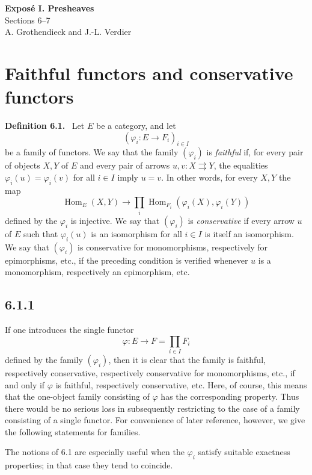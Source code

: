 \documentclass[11pt]{article}
\newcommand{\Hom}{\operatorname{Hom}}
\newenvironment{statement}[1]{\par\medskip\noindent\textbf{#1.}\ }{\par\medskip}
\begin{document}
\begin{center}
{\Large \textbf{Expos\'e I. Presheaves}}\\[0.35em]
{\large Sections 6--7}\\[0.35em]
A. Grothendieck and J.-L. Verdier
\end{center}

\bigskip


\setcounter{section}{5}
\section{Faithful functors and conservative functors}

\begin{statement}{Definition 6.1}
Let $E$ be a category, and let
\[
(\varphi_i:E\to F_i)_{i\in I}
\]
be a family of functors. We say that the family $(\varphi_i)$ is \emph{faithful} if, for every pair of objects $X,Y$ of $E$ and every pair of arrows $u,v:X\rightrightarrows Y$, the equalities $\varphi_i(u)=\varphi_i(v)$ for all $i\in I$ imply $u=v$. In other words, for every $X,Y$ the map
\[
\Hom_E(X,Y)\longrightarrow \prod_i \Hom_{F_i}(\varphi_i(X),\varphi_i(Y))
\]
defined by the $\varphi_i$ is injective. We say that $(\varphi_i)$ is \emph{conservative} if every arrow $u$ of $E$ such that $\varphi_i(u)$ is an isomorphism for all $i\in I$ is itself an isomorphism. We say that $(\varphi_i)$ is conservative for monomorphisms, respectively for epimorphisms, etc., if the preceding condition is verified whenever $u$ is a monomorphism, respectively an epimorphism, etc.
\end{statement}

\subsection*{6.1.1}
If one introduces the single functor
\[
\varphi:E\longrightarrow F=\prod_{i\in I}F_i
\]
defined by the family $(\varphi_i)$, then it is clear that the family is faithful, respectively conservative, respectively conservative for monomorphisms, etc., if and only if $\varphi$ is faithful, respectively conservative, etc. Here, of course, this means that the one-object family consisting of $\varphi$ has the corresponding property. Thus there would be no serious loss in subsequently restricting to the case of a family consisting of a single functor. For convenience of later reference, however, we give the following statements for families.

The notions of 6.1 are especially useful when the $\varphi_i$ satisfy suitable exactness properties; in that case they tend to coincide.
\end{document}
